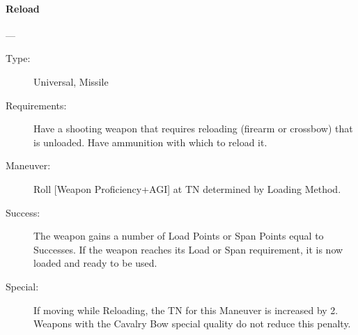 \documentclass[oneside,11pt,english]{book}
\begin{document}
\paragraph{\large\label{man:Reload}Reload}---\quad{\large[???????]}
\vspace{-10pt}\begin{description} 
\item [Type:] Universal, Missile 
\item [Requirements:] Have a shooting weapon that requires reloading (firearm or crossbow) that is unloaded. 
  Have ammunition with which to reload it. 
\item [Maneuver:] Roll [Weapon Proficiency+AGI] at TN determined by Loading Method. 
\item [Success:] The weapon gains a number of Load Points or Span Points equal to Successes. If the weapon 
  reaches its Load or Span requirement, it is now loaded and ready to be used. 
\item [Special:] If moving while Reloading, the TN for this Maneuver is increased by 2. Weapons with the 
  Cavalry Bow special quality do not reduce this penalty. 
\end{description}
\end{document}

